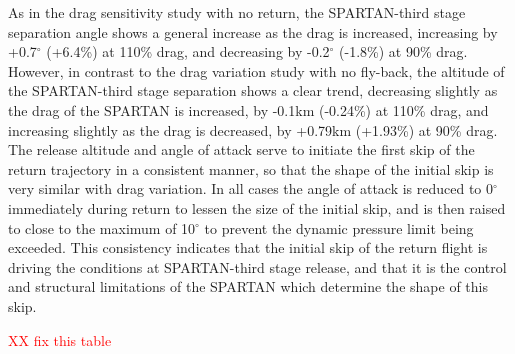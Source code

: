 As in the drag sensitivity study with no return, the SPARTAN-third stage separation angle shows a general increase as the drag is increased, increasing by +0.7$^\circ$ (+6.4\%) at 110\% drag, and decreasing by -0.2$^\circ$ (-1.8\%) at 90\% drag. However, in contrast to the drag variation study with no fly-back,
the altitude of the SPARTAN-third stage separation shows a clear trend, decreasing slightly as the drag of the SPARTAN is increased, by -0.1km (-0.24\%) at 110\% drag, and increasing slightly as the drag is decreased, by +0.79km (+1.93\%) at 90\% drag.  
The release altitude and angle of attack serve to initiate the first skip of the return trajectory in a consistent manner, so that the shape of the initial skip is very similar with drag variation. In all cases the angle of attack is reduced to 0$^\circ$ immediately during return to lessen the size of the initial skip, and is then raised to close to the maximum of 10$^\circ$ to prevent the dynamic pressure limit being exceeded. This consistency indicates that the initial skip of the return flight is driving the conditions at SPARTAN-third stage release, and that it is the control and structural limitations of the SPARTAN which determine the shape of this skip. 


\textcolor{red}{XX fix this table}

